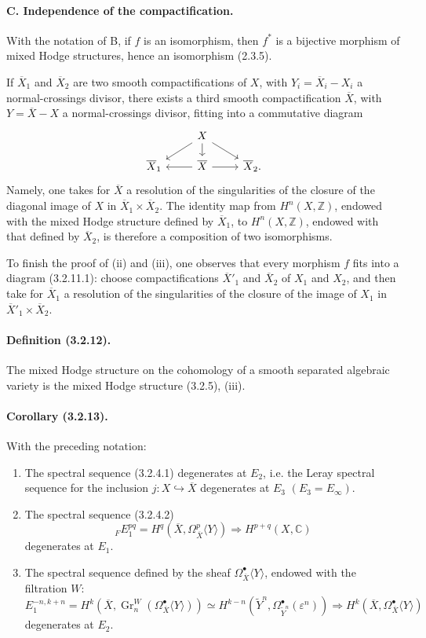 \documentclass[10pt]{article}
\newcommand{\C}{\mathbb C}
\newcommand{\Z}{\mathbb Z}
\newcommand{\Gr}{\operatorname{Gr}}
\begin{document}
\paragraph{C. Independence of the compactification.} With the notation of B, if $f$ is an isomorphism, then $f^*$ is a bijective morphism of mixed Hodge structures, hence an isomorphism (2.3.5).

If $\overline X_1$ and $\overline X_2$ are two smooth compactifications of $X$, with $Y_i=\overline X_i-X_i$ a normal-crossings divisor, there exists a third smooth compactification $\overline X$, with $Y=\overline X-X$ a normal-crossings divisor, fitting into a commutative diagram
\[
\begin{tikzcd}[row sep=1.2em,column sep=2.4em]
& X \arrow[dl] \arrow[d] \arrow[dr] & \\
\overline X_1 & \overline X \arrow[l] \arrow[r] & \overline X_2 .
\end{tikzcd}
\]
Namely, one takes for $\overline X$ a resolution of the singularities of the closure of the diagonal image of $X$ in $\overline X_1\times\overline X_2$. The identity map from $H^n(X,\Z)$, endowed with the mixed Hodge structure defined by $\overline X_1$, to $H^n(X,\Z)$, endowed with that defined by $\overline X_2$, is therefore a composition of two isomorphisms.

To finish the proof of (ii) and (iii), one observes that every morphism $f$ fits into a diagram (3.2.11.1): choose compactifications $\overline X'_1$ and $\overline X_2$ of $X_1$ and $X_2$, and then take for $\overline X_1$ a resolution of the singularities of the closure of the image of $X_1$ in $\overline X'_1\times\overline X_2$.

\paragraph{Definition (3.2.12).} The mixed Hodge structure on the cohomology of a smooth separated algebraic variety is the mixed Hodge structure (3.2.5), (iii).

\paragraph{Corollary (3.2.13).} With the preceding notation:
\begin{enumerate}[label=(\roman*)]
\item The spectral sequence (3.2.4.1) degenerates at $E_2$, i.e. the Leray spectral sequence for the inclusion $j:X\hookrightarrow\overline X$ degenerates at $E_3$ $(E_3=E_\infty)$.
\item The spectral sequence (3.2.4.2)
\[
{}_F E_1^{pq}=H^q(\overline X,\Omega_{\overline X}^p\langle Y\rangle)
\Longrightarrow H^{p+q}(X,\C)
\]
degenerates at $E_1$.
\item The spectral sequence defined by the sheaf $\Omega_{\overline X}^{\bullet}\langle Y\rangle$, endowed with the filtration $W$:
\[
E_1^{-n,k+n}=H^k(\overline X,\Gr_n^W(\Omega_{\overline X}^{\bullet}\langle Y\rangle))
\simeq H^{k-n}(\widetilde Y^n,\Omega_{\widetilde Y^n}^{\bullet}(\varepsilon^n))
\Longrightarrow H^k(\overline X,\Omega_{\overline X}^{\bullet}\langle Y\rangle)
\]
degenerates at $E_2$.
\end{enumerate}
\end{document}
